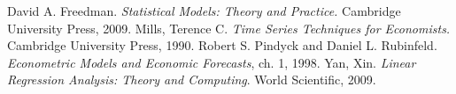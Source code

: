 \bibitem{}  David A. Freedman. \textit{Statistical Models: Theory and Practice.} Cambridge University Press, 2009.
\bibitem{} Mills, Terence C. \textit{Time Series Techniques for Economists.} Cambridge University Press, 1990.
\bibitem{} Robert S. Pindyck and Daniel L. Rubinfeld. \textit{Econometric Models and Economic Forecasts}, ch. 1, 1998.
\bibitem{} Yan, Xin. \textit{Linear Regression Analysis: Theory and Computing}. World Scientific, 2009.